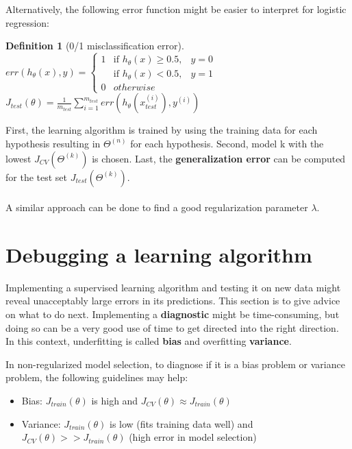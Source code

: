 \documentclass{report}
\newtheorem{definition}{Definition}[section]
\begin{document}
Alternatively, the following error function might be easier to interpret for logistic regression:

\begin{definition}[0/1 misclassification error] ~\\
$err(h_\theta(x),y)=
\left\{
\begin{array}{lll}
1  & \mbox{if } h_\theta(x) \geq 0.5, & y=0 \\
  & \mbox{if } h_\theta(x) < 0.5, & y=1 \\
0 & otherwise
\end{array}
\right.$ \\
$J_{test}(\theta) = \frac{1}{m_{test}}\sum_{i=1}^{m_{test}}err(h_\theta(x_{test}^{(i)}),y^{(i)})$
\end{definition}


First, the learning algorithm is trained by using the training data for each hypothesis resulting in $\Theta^{(n)}$ for each hypothesis. Second, model {k} with the lowest $J_{CV}(\Theta^{(k)})$ is chosen. Last, the {\bf generalization error} can be computed for the test set $J_{test}(\Theta^{(k)})$.
\\
\\
A similar approach can be done to find a good regularization parameter $\lambda$.

\section{Debugging a learning algorithm}
\label{chapter:debugginglearning}
Implementing a supervised learning algorithm and testing it on new data might reveal unacceptably large errors in its predictions. This section is to give advice on what to do next. Implementing a {\bf diagnostic} might be time-consuming, but doing so can be a very good use of time to get directed into the right direction. In this context, underfitting is called {\bf bias} and overfitting {\bf variance}.

In non-regularized model selection, to diagnose if it is a bias problem or variance problem, the following guidelines may help:
\begin{itemize}
\item Bias: $J_{train}(\theta)$ is high and $J_{CV}(\theta)\approx J_{train}(\theta)$
\item Variance: $J_{train}(\theta)$ is low (fits training data well) and $J_{CV}(\theta)>>J_{train}(\theta)$ (high error in model selection)
\end{itemize}
\end{document}
